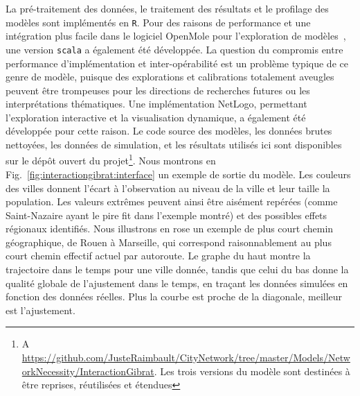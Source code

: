 {La pré-traitement des données, le traitement des résultats et le profilage des modèles sont implémentés en \texttt{R}. Pour des raisons de performance et une intégration plus facile dans le logiciel OpenMole pour l'exploration de modèles~\cite{reuillon2013openmole}, une version \texttt{scala} a également été développée. La question du compromis entre performance d'implémentation et inter-opérabilité est un problème typique de ce genre de modèle, puisque des explorations et calibrations totalement aveugles peuvent être trompeuses pour les directions de recherches futures ou les interprétations thématiques. Une implémentation NetLogo, permettant l'exploration interactive et la visualisation dynamique, a également été développée pour cette raison. Le code source des modèles, les données brutes nettoyées, les données de simulation, et les résultats utilisés ici sont disponibles sur le dépôt ouvert du projet\footnote{A \url{https://github.com/JusteRaimbault/CityNetwork/tree/master/Models/NetworkNecessity/InteractionGibrat}. Les trois versions du modèle sont destinées à être reprises, réutilisées et étendues }. Nous montrons en Fig.~\ref{fig:interactiongibrat:interface} un exemple de sortie du modèle. Les couleurs des villes donnent l'écart à l'observation au niveau de la ville et leur taille la population. Les valeurs extrêmes peuvent ainsi être aisément repérées (comme Saint-Nazaire ayant le pire fit dans l'exemple montré) et des possibles effets régionaux identifiés. Nous illustrons en rose un exemple de plus court chemin géographique, de Rouen à Marseille, qui correspond raisonnablement au plus court chemin effectif actuel par autoroute. Le graphe du haut montre la trajectoire dans le temps pour une ville donnée, tandis que celui du bas donne la qualité globale de l'ajustement dans le temps, en traçant les données simulées en fonction des données réelles. Plus la courbe est proche de la diagonale, meilleur est l'ajustement.
}

